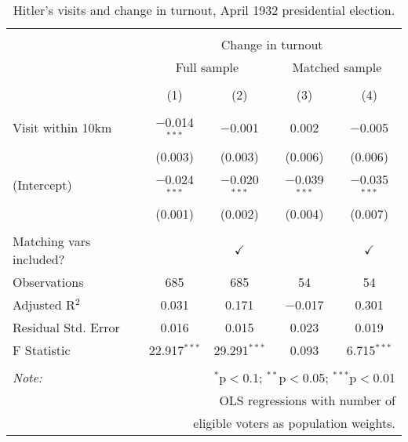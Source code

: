 
\begin{table}[!htbp] \centering 
  \caption{Hitler's visits and change in turnout, April 1932 presidential election.} 
  \label{tab:ols-pres-turnout} 
\begin{tabular}{@{\extracolsep{5pt}}lcccc} 
\\[-1.8ex]\hline 
\hline \\[-1.8ex] 
 & \multicolumn{4}{c}{Change in turnout} \\ 
\cline{2-5} 
 & \multicolumn{2}{c}{Full sample} & \multicolumn{2}{c}{Matched sample} \\ 
\\[-1.8ex] & (1) & (2) & (3) & (4)\\ 
\hline \\[-1.8ex] 
 Visit within 10km & $-$0.014$^{***}$ & $-$0.001 & 0.002 & $-$0.005 \\ 
  & (0.003) & (0.003) & (0.006) & (0.006) \\ 
  (Intercept) & $-$0.024$^{***}$ & $-$0.020$^{***}$ & $-$0.039$^{***}$ & $-$0.035$^{***}$ \\ 
  & (0.001) & (0.002) & (0.004) & (0.007) \\ 
 \hline \\[-1.8ex] 
Matching vars included? &  & \multicolumn{1}{c}{$\checkmark$} &  & \multicolumn{1}{c}{$\checkmark$} \\ 
Observations & 685 & 685 & 54 & 54 \\ 
Adjusted R$^{2}$ & 0.031 & 0.171 & $-$0.017 & 0.301 \\ 
Residual Std. Error & 0.016 & 0.015 & 0.023 & 0.019 \\ 
F Statistic & 22.917$^{***}$ & 29.291$^{***}$ & 0.093 & 6.715$^{***}$ \\ 
\hline 
\hline \\[-1.8ex] 
\textit{Note:}  & \multicolumn{4}{r}{$^{*}$p$<$0.1; $^{**}$p$<$0.05; $^{***}$p$<$0.01} \\ 
 & \multicolumn{4}{r}{OLS regressions with number of} \\ 
 & \multicolumn{4}{r}{eligible voters as population weights.} \\ 
\end{tabular} 
\end{table} 
